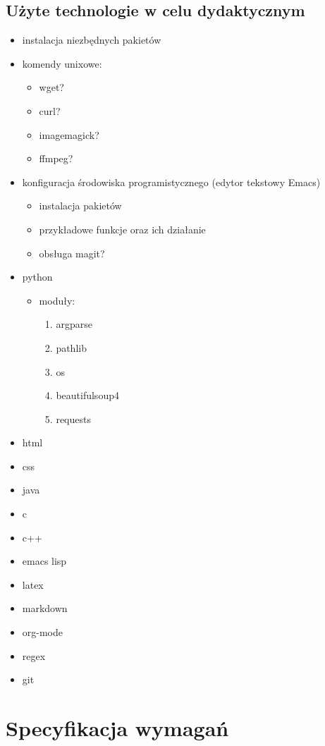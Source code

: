 \documentclass[11pt]{article}
\begin{document}
\subsection{Użyte technologie w celu dydaktycznym}
\label{sec:org465b9c6}
\begin{itemize}
\item instalacja niezbędnych pakietów
\item komendy unixowe:
\begin{itemize}
\item wget?
\item curl?
\item imagemagick?
\item ffmpeg?
\end{itemize}
\item konfiguracja środowiska programistycznego (edytor tekstowy Emacs)
\begin{itemize}
\item instalacja pakietów
\item przykładowe funkcje oraz ich działanie
\item obsługa magit?
\end{itemize}
\item python
\begin{itemize}
\item moduły:
\begin{enumerate}
\item argparse
\item pathlib
\item os
\item beautifulsoup4
\item requests
\end{enumerate}
\end{itemize}
\item html
\item css
\item java
\item c
\item c++
\item emacs lisp
\item latex
\item markdown
\item org-mode
\item regex
\item git
\end{itemize}
\section{Specyfikacja wymagań}
\label{sec:org9f3d099}
\end{document}
